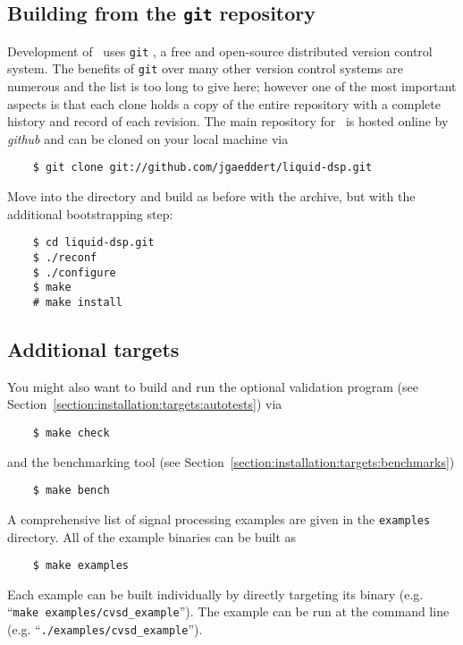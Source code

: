 \subsection{Building from the {\tt git} repository}
\label{section:quickstart:build_from_git}
Development of \liquid\ uses {\tt git} \cite{git:web}, a free and
open-source distributed version control system.
The benefits of {\tt git} over many other version control systems are
numerous and the list is too long to give here;
however one of the most important aspects is that each clone holds a
copy of the entire repository with a complete history and record of each
revision.
The main repository for \liquid\ is hosted online by {\em github}
\cite{github:web} and can be cloned on your local machine via
%
\begin{verbatim}
    $ git clone git://github.com/jgaeddert/liquid-dsp.git
\end{verbatim}
%
Move into the directory and build as before with the archive,
but with the additional bootstrapping step:
%
\begin{verbatim}
    $ cd liquid-dsp.git
    $ ./reconf
    $ ./configure
    $ make
    # make install
\end{verbatim}

\subsection{Additional targets}
\label{section:quickstart:additional_targets}
%
You might also want to build and run the optional validation program
(see Section~\ref{section:installation:targets:autotests}) via
\begin{verbatim}
    $ make check
\end{verbatim}
and the benchmarking tool
(see Section~\ref{section:installation:targets:benchmarks})
\begin{verbatim}
    $ make bench
\end{verbatim}
%
A comprehensive list of signal processing examples are given in the
{\tt examples} directory.
All of the example binaries can be built as
\begin{verbatim}
    $ make examples
\end{verbatim}
%
Each example can be built individually by directly targeting its binary
(e.g. ``{\tt make examples/cvsd\_example}'').
The example can be run at the command line
(e.g. ``{\tt ./examples/cvsd\_example}'').

